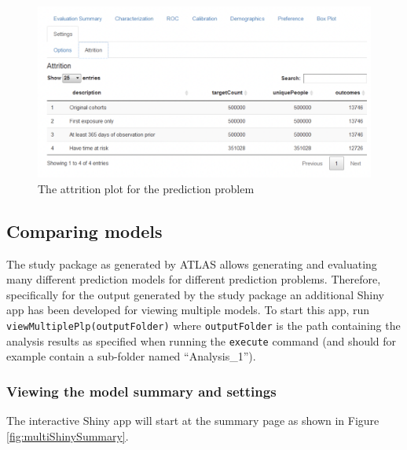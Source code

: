 \documentclass[11pt]{book}
\theoremstyle{definition}
\theoremstyle{definition}
\theoremstyle{definition}
\theoremstyle{remark}
\begin{document}
\begin{figure}

{\centering \includegraphics[width=1\linewidth]{images/PatientLevelPrediction/shiny/singleShiny/singleShinyAtt} 

}

\caption{The attrition plot for the prediction problem}\label{fig:shinyAtt}
\end{figure}

\hypertarget{comparing-models}{%
\subsection{Comparing models}\label{comparing-models}}

The study package as generated by ATLAS allows generating and evaluating many different prediction models for different prediction problems. Therefore, specifically for the output generated by the study package an additional Shiny app has been developed for viewing multiple models. To start this app, run \texttt{viewMultiplePlp(outputFolder)} where \texttt{outputFolder} is the path containing the analysis results as specified when running the \texttt{execute} command (and should for example contain a sub-folder named ``Analysis\_1'').

\hypertarget{viewing-the-model-summary-and-settings}{%
\subsubsection*{Viewing the model summary and settings}\label{viewing-the-model-summary-and-settings}}

The interactive Shiny app will start at the summary page as shown in Figure \ref{fig:multiShinySummary}.
\end{document}
